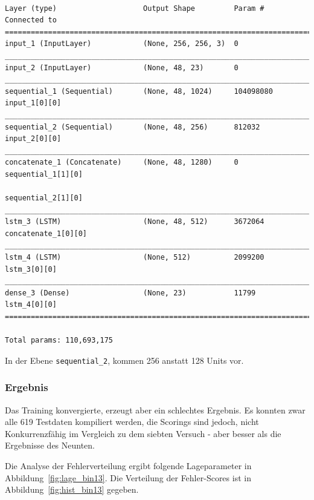 \documentclass[pdftex,a4paper,halfparskip, article]{scrartcl}
\begin{document}
\begin{verbatim}

Layer (type)                    Output Shape         Param #     Connected to
==============================================================================
input_1 (InputLayer)            (None, 256, 256, 3)  0
______________________________________________________________________________
input_2 (InputLayer)            (None, 48, 23)       0
______________________________________________________________________________
sequential_1 (Sequential)       (None, 48, 1024)     104098080   input_1[0][0]
______________________________________________________________________________
sequential_2 (Sequential)       (None, 48, 256)      812032      input_2[0][0]
______________________________________________________________________________
concatenate_1 (Concatenate)     (None, 48, 1280)     0           sequential_1[1][0]
                                                                 sequential_2[1][0]
______________________________________________________________________________
lstm_3 (LSTM)                   (None, 48, 512)      3672064     concatenate_1[0][0]
______________________________________________________________________________
lstm_4 (LSTM)                   (None, 512)          2099200     lstm_3[0][0]
______________________________________________________________________________
dense_3 (Dense)                 (None, 23)           11799       lstm_4[0][0]
==============================================================================

Total params: 110,693,175
\end{verbatim}

In der Ebene \texttt{sequential\_2}, kommen 256 anstatt 128 Units vor.

\subsubsection*{Ergebnis}

Das Training konvergierte, erzeugt aber ein schlechtes Ergebnis. Es konnten zwar alle 619 Testdaten kompiliert werden, die Scorings sind jedoch, nicht Konkurrenzfähig im Vergleich zu dem siebten Versuch - aber besser als die Ergebnisse des Neunten.

Die Analyse der Fehlerverteilung ergibt folgende Lageparameter in Abbildung~\ref{fig:lage_bin13}. Die Verteilung der Fehler-Scores ist in Abbildung~\ref{fig:hist_bin13} gegeben.
\end{document}
